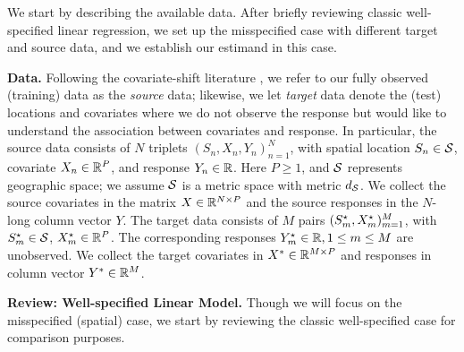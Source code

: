 We start by describing the available data. After briefly reviewing classic well-specified linear regression, we set up the misspecified case with different target and source data, and we establish our estimand in this case.

\textbf{Data.}
Following the covariate-shift literature \citep{bendavid_2006_analysis,pan_2010_transfer,Csurka2017}, we refer to our fully observed (training) data as the \emph{source} data; likewise, we let \emph{target} data denote the (test) locations and covariates where we do not observe the response but would like to understand the association between covariates and response. In particular, the source data consists of $N$ triplets $(S_n, X_n, Y_n)_{n=1}^N$, with spatial location $S_n \in \mathcal{S}$, covariate $X_n \in \mathbb{R}^P$, and response $Y_n \in \mathbb{R}$. Here $P \ge 1$, and $\mathcal{S}$ represents geographic space; we assume $\mathcal{S}$ is a metric space with metric $d_{\mathcal{S}}$. We collect the source covariates in the matrix $X \in \mathbb{R}^{N \times P}$ and the source responses in the $N$-long column vector $Y$.
The target data consists of $M$ pairs $(S^{\star}_m, X^{\star}_m)_{m=1}^M$, with $S^{\star}_m \in \mathcal{S}$, $X^{\star}_m \in \mathbb{R}^{P}$. The corresponding responses $Y^{\star}_m \in \mathbb{R}, 1 \leq m \leq M$ are unobserved. We collect the target covariates in $X^{*} \in \mathbb{R}^{M \times P}$ and responses in column vector $Y^{*} \in \mathbb{R}^{M}$.

\textbf{Review: Well-specified Linear Model.} Though we will focus on the misspecified (spatial) case, we start by reviewing the classic well-specified case for comparison purposes.

